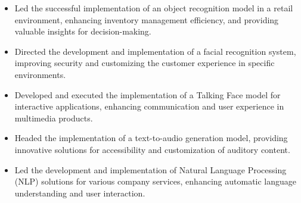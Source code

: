 \begin{itemize}
  \item {}
 Led the successful implementation of an object recognition model in a retail environment, enhancing inventory management efficiency, and providing valuable insights for decision-making.

  \item {}
 Directed the development and implementation of a facial recognition system, improving security and customizing the customer experience in specific environments.

  \item {}
 Developed and executed the implementation of a Talking Face model for interactive applications, enhancing communication and user experience in multimedia products.

  \item {}
 Headed the implementation of a text-to-audio generation model, providing innovative solutions for accessibility and customization of auditory content.

  \item {}
 Led the development and implementation of Natural Language Processing (NLP) solutions for various company services, enhancing automatic language understanding and user interaction.
\end{itemize}

\divider

